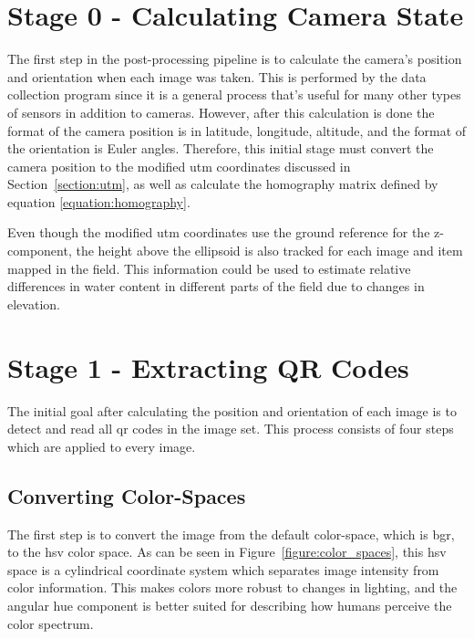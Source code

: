 \section{Stage 0 - Calculating Camera State}
\label{processing-stage0}

The first step in the post-processing pipeline is to calculate the camera's position and orientation when each image was taken.  This is performed by the data collection program since it is a general process that's useful for many other types of sensors in addition to cameras.  However, after this calculation is done the format of the camera position is in latitude, longitude, altitude, and the format of the orientation is Euler angles.  Therefore, this initial stage must convert the camera position to the modified \ac{utm} coordinates discussed in Section~\ref{section:utm}, as well as calculate the homography matrix defined by equation \ref{equation:homography}.  

Even though the modified \ac{utm} coordinates use the ground reference for the z-component, the height above the ellipsoid is also tracked for each image and item mapped in the field.  This information could be used to estimate relative differences in water content in different parts of the field due to changes in elevation. 

\section{Stage 1 - Extracting QR Codes}
\label{processing-stage1}

The initial goal after calculating the position and orientation of each image is to detect and read all \ac{qr} codes in the image set.  This process consists of four steps which are applied to every image.

\subsection{Converting Color-Spaces}

The first step is to convert the image from the default color-space, which is \ac{bgr}, to the \ac{hsv} color space.  As can be seen in Figure~\ref{figure:color_spaces}, this \ac{hsv} space is a cylindrical coordinate system which separates image intensity from color information.  This makes colors more robust to changes in lighting, and the angular hue component is better suited for describing how humans perceive the color spectrum.

